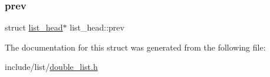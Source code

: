 \subsubsection{\texorpdfstring{prev}{prev}}
{\footnotesize\ttfamily struct \mbox{\hyperlink{structlist__head}{list\+\_\+head}}$\ast$ list\+\_\+head\+::prev}



The documentation for this struct was generated from the following file\+:\begin{DoxyCompactItemize}
\item 
include/list/\mbox{\hyperlink{double__list_8h}{double\+\_\+list.\+h}}\end{DoxyCompactItemize}
